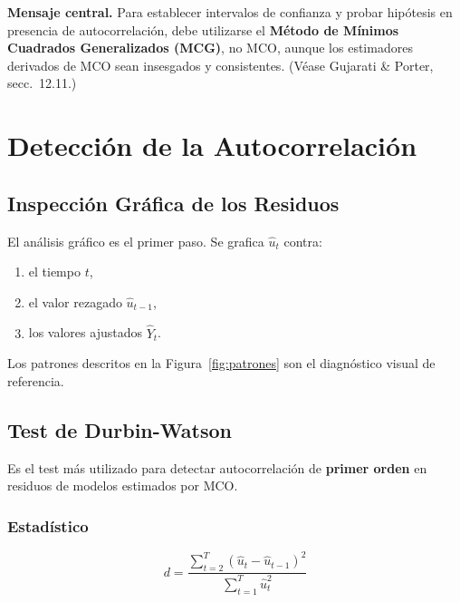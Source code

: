 \documentclass[12pt,a4paper]{article}
\theoremstyle{definition}
\theoremstyle{remark}
\begin{document}
\begin{advertencia}
  \textbf{Mensaje central.} Para establecer intervalos de confianza
  y probar hipótesis en presencia de autocorrelación, debe utilizarse
  el \textbf{Método de Mínimos Cuadrados Generalizados (MCG)}, no MCO,
  aunque los estimadores derivados de MCO sean insesgados y consistentes.
  (Véase Gujarati \& Porter, secc.~12.11.)
\end{advertencia}

\section{Detección de la Autocorrelación}
\label{sec:deteccion}

\subsection{Inspección Gráfica de los Residuos}

El análisis gráfico es el primer paso. Se grafica $\hat{u}_t$ contra:
\begin{enumerate}[label=\textbf{(\alph*)}, itemsep=3pt]
  \item el tiempo $t$,
  \item el valor rezagado $\hat{u}_{t-1}$,
  \item los valores ajustados $\hat{Y}_t$.
\end{enumerate}
Los patrones descritos en la Figura~\ref{fig:patrones} son el diagnóstico
visual de referencia.

\subsection{Test de Durbin-Watson}
\label{subsec:dw}

Es el test más utilizado para detectar autocorrelación de \textbf{primer
orden} en residuos de modelos estimados por MCO.

\subsubsection{Estadístico}

\begin{equation}
  d = \frac{\displaystyle\sum_{t=2}^{T}(\hat{u}_t - \hat{u}_{t-1})^2}
           {\displaystyle\sum_{t=1}^{T}\hat{u}_t^2}
  \label{eq:dw}
\end{equation}
\end{document}
